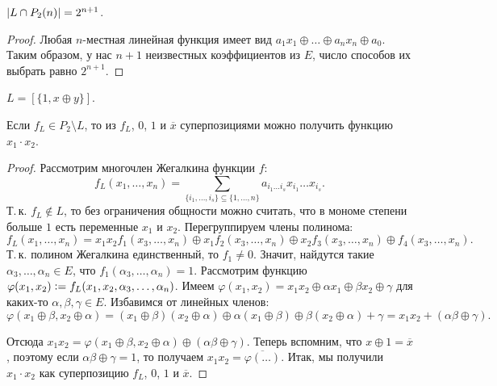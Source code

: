 \begin{proposal}
    $\left\lvert L \cap P_2(n)\right\rvert = 2^{n + 1}$.
\end{proposal}

\begin{proof}
    Любая $n$-местная линейная функция имеет вид $a_1x_1 \oplus \ldots \oplus a_nx_n \oplus a_0$. Таким образом, у нас $n + 1$ неизвестных коэффициентов из $E$, число способов их выбрать равно $2^{n + 1}$.
\end{proof}

\begin{proposal}
    $L = [\{1, x \oplus y\}]$.
\end{proposal}

\begin{lemma}
    Если $f_L \in P_2 \setminus L$, то из $f_L$, $0$, $1$ и $\overline{x}$ суперпозициями можно получить функцию $x_1 \cdot x_2$.
\end{lemma}

\begin{proof}
    Рассмотрим многочлен Жегалкина функции $f$:
        \[
            f_L(x_1, \ldots, x_n) = \sum_{\{i_1, \ldots, i_s\} \subseteq \{1, \ldots, n\}}a_{i_1\ldots i_s}x_{i_1}\ldots x_{i_s}.
        \]
        Т.\,к. $f_L \notin L$, то без ограничения общности можно считать, что в мономе степени больше $1$ есть переменные $x_1$ и $x_2$. Перегруппируем члены полинома:
        \[
            f_L(x_1, \ldots, x_n) = x_1x_2f_1(x_3, \ldots, x_n) \oplus x_1f_2(x_3, \ldots, x_n) \oplus x_2f_3(x_3, \ldots, x_n) \oplus f_4(x_3, \ldots, x_n).
        \]
        Т.\,к. полином Жегалкина единственный, то $f_1 \ne 0$. Значит, найдутся такие $\alpha_3, \ldots, \alpha_n \in E$, что $f_1(\alpha_3, \ldots, \alpha_n) = 1$. Рассмотрим функцию $\varphi(x_1, x_2) \vcentcolon = f_L(x_1, x_2, \alpha_3, \ldots, \alpha_n)$. Имеем $\varphi(x_1, x_2) = x_1x_2 \oplus \alpha x_1 \oplus \beta x_2 \oplus \gamma$ для каких-то $\alpha, \beta, \gamma \in E$. Избавимся от линейных членов:
        \[
            \varphi(x_1 \oplus \beta, x_2 \oplus \alpha) = (x_1 \oplus \beta)(x_2 \oplus \alpha) \oplus \alpha(x_1 \oplus \beta) \oplus \beta(x_2 \oplus \alpha) + \gamma = x_1x_2 + (\alpha\beta \oplus \gamma).
        \]

        Отсюда $x_1x_2 = \varphi(x_1 \oplus \beta, x_2 \oplus \alpha) \oplus (\alpha\beta \oplus \gamma)$. Теперь вспомним, что $x \oplus 1 = \overline{x}$, поэтому если $\alpha\beta \oplus \gamma = 1$, то получаем $x_1x_2 = \overline{\varphi(\ldots)}$. Итак, мы получили $x_1 \cdot x_2$ как суперпозицию $f_L$, $0$, $1$ и $\overline{x}$.
\end{proof}



